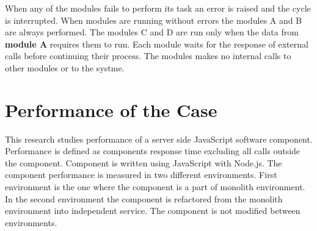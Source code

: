 When any of the modules fails to perform its task an error is raised and the cycle is interrupted.
When modules are running without errors the modules A and B are always performed. 
The modules C and D are run only when the data from \textbf{module A} requires them to run.
Each module waits for the response of external calls before continuing their process.
The modules makes no internal calls to other modules or to the systme.

\section{Performance of the Case}
This research studies performance of a server side JavaScript software component.
Performance is defined as components response time excluding all calls outside the component.
Component is written using JavaScript with Node.js.
The component performance is measured in two different environments.
First environment is the one where the component is a part of monolith environment.
In the second environment the component is refactored from the monolith environment into independent service.
The component is not modified between environments.
